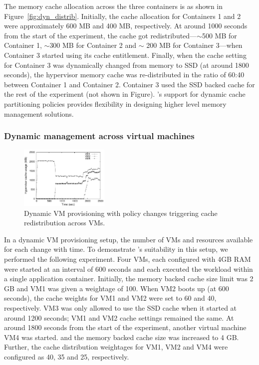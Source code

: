 The \dd{} memory cache allocation across the three containers is as shown 
in Figure~\ref{fig:dyn_distrib}.
%
Initially, the cache allocation for Containers 1 and 2 were approximately 
600 MB and 400 MB,
respectively.
%
At around 1000 seconds from the start of the experiment, the \dd{} cache got 
redistributed---$\sim$500 MB for Container 1, $\sim$300 MB  for Container 2 and
$\sim$ 200 MB for Container 3---when Container 3 started using its cache entitlement.
%
Finally, when the \dd{} cache setting for Container 3 was dynamically changed 
from memory to SSD (at around 1800 seconds), the hypervisor memory 
cache was re-distributed in the ratio of 60:40 between Container 1 and Container 2.
%
Container 3 used the SSD backed \dd{} cache for the rest of the 
experiment (not shown in Figure).
%
\dd's support for dynamic cache partitioning policies provides
flexibility in designing higher level memory management solutions. 

\subsubsection{Dynamic management across virtual machines}
\begin{figure}[t]
  \centering
\includegraphics[width=0.38\textwidth]{data/dynamic_vms/musage}
\vspace{-0.2cm}
 \caption{Dynamic VM provisioning with policy changes triggering \dd{} cache 
          redistribution across VMs.}
\vspace{-0.25cm}
 \label{fig:vm_distrib}
\end{figure} 
In a dynamic VM provisioning setup, the number of VMs and resources
available for each change with time.
%
To demonstrate \dd's suitability in this setup, we performed the
following experiment.
%
Four VMs, each configured with 4GB RAM were started at an
interval of 600 seconds and
each executed the \video{} workload within 
a single application container. 
%
Initially, the \dd{} memory backed cache size limit was 2 GB and VM1 
was given a weightage of 100.
%
When VM2 boots up (at 600 seconds), the \dd{} cache weights 
for VM1 and VM2 were set to 60 and 40, respectively.
%
VM3 was only allowed to use the SSD cache when it started at around 1200 
seconds; VM1 and VM2 cache settings remained the same.
%
At around 1800 seconds from the start of the experiment, another
virtual machine VM4 was started.
and the \dd{} memory backed cache size was increased to 4 GB.
%
Further, the cache distribution weightages for VM1, VM2 and VM4 
were configured as 40, 35 and 25, respectively.

